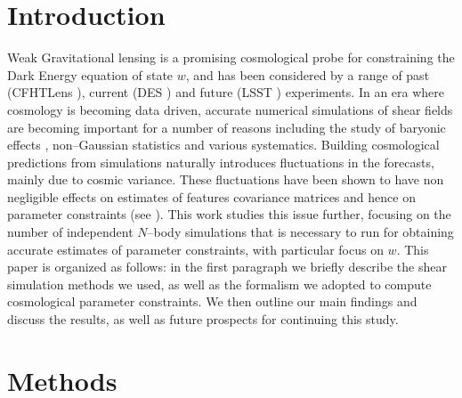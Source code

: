 \documentclass[reprint,aps,prd,superscriptaddress,showkeys,showpacs]{revtex4-1}
\begin{document}
\maketitle



\section{Introduction}
%
Weak Gravitational lensing is a promising cosmological probe for constraining the Dark Energy equation of state $w$, and has been considered by a range of past (CFHTLens \citep{cfht1,cfht2}), current (DES \citep{DES}) and future (LSST \citep{LSST}) experiments. In an era where cosmology is becoming data driven, accurate numerical simulations of shear fields are becoming important for a number of reasons including the study of baryonic effects \citep{BaryonXiuyuan}, non--Gaussian statistics \citep{PeaksJan,MinkJan,MinkPetri} and various systematics. Building cosmological predictions from simulations naturally introduces fluctuations in the forecasts, mainly due to cosmic variance. These fluctuations have been shown to have non negligible effects on estimates of features covariance matrices and hence on parameter constraints (see \citep{DodelsonSchneider13}). This work studies this issue further, focusing on the number of independent $N$--body simulations that is necessary to run for obtaining accurate estimates of parameter constraints, with particular focus on $w$. This paper is organized as follows: in the first paragraph we briefly describe the shear simulation methods we used, as well as the formalism we adopted to compute cosmological parameter constraints. We then outline our main findings and discuss the results, as well as future prospects for continuing this study.  


\section{Methods}
\end{document}
